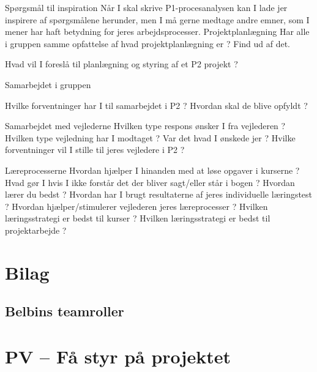 \documentclass[oneside,a4paper,titlepage]{article}
\begin{document}


Spørgsmål til inspiration
Når I skal skrive P1-procesanalysen kan I lade jer inspirere af spørgsmålene herunder, men I må
gerne medtage andre emner, som I mener har haft betydning for jeres arbejdsprocesser.
Projektplanlægning
Har alle i gruppen samme opfattelse af hvad projektplanlægning er ? Find ud af det.

Hvad vil I foreslå til planlægning og styring af et P2 projekt ?

Samarbejdet i gruppen

Hvilke forventninger har I til samarbejdet i P2 ? Hvordan skal de blive opfyldt ?

Samarbejdet med vejlederne
Hvilken type respons ønsker I fra vejlederen ?
Hvilken type vejledning har I modtaget ? Var det hvad I ønskede jer ?
Hvilke forventninger vil I stille til jeres vejledere i P2 ?

Læreprocesserne
Hvordan hjælper I hinanden med at løse opgaver i kurserne ?
Hvad gør I hvis I ikke forstår det der bliver sagt/eller står i bogen ?
Hvordan lærer du bedst ?
Hvordan har I brugt resultaterne af jeres individuelle læringstest ?
Hvordan hjælper/stimulerer vejlederen jeres læreprocesser ?
Hvilken læringsstrategi er bedst til kurser ?
Hvilken læringsstrategi er bedst til projektarbejde ?


\clearpage
\section{Bilag}

\subsection{Belbins teamroller}
\label{sec:styr_paa_projektet}
\section*{PV – Få styr på projektet}
\end{document}
